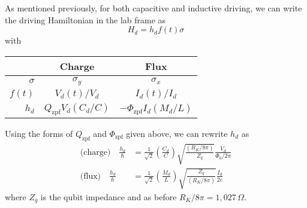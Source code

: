 

As mentioned previously, for both capacitive and inductive driving, we can write the driving Hamiltonian in the lab frame as
\begin{equation*}
  H_d = h_d f(t) \sigma
\end{equation*}
with
\begin{center}
  \begin{tabular}{r|cc}
    \hline
    & \textbf{Charge} & \textbf{Flux} \\
    \hline
    $\sigma$ & $\sigma_y$ & $\sigma_x$ \\
    $f(t)$ & $V_d(t)/V_d$ & $I_d(t) / I_d$ \\
    $h_d$ & $Q_\text{zpf} V_d(C_d/C)$ & $-\Phi_\text{zpf} I_d (M_d/L)$ \\
    \hline
  \end{tabular}
\end{center}
Using the forms of $Q_\text{zpf}$ and $\Phi_\text{zpf}$ given above, we can rewrite $h_d$ as
\begin{align*}
  \text{(charge)} \quad \frac{h_d}{\hbar} &=
  \frac{1}{\sqrt{2}} \left(\frac{C_d}{C} \right) \sqrt{\frac{(R_K / 8\pi)}{Z_q}} \frac{V_d}{\Phi_0/2\pi} \\
  \text{(flux)} \quad \frac{h_d}{\hbar} &=
  \frac{1}{\sqrt{2}} \left( \frac{M_d}{L} \right) \sqrt{\frac{Z_q}{(R_K/8\pi)}} \frac{I_d}{2e}
\end{align*}
where $Z_q$ is the qubit impedance and as before $R_K / 8 \pi = 1,027 \, \Omega$.


